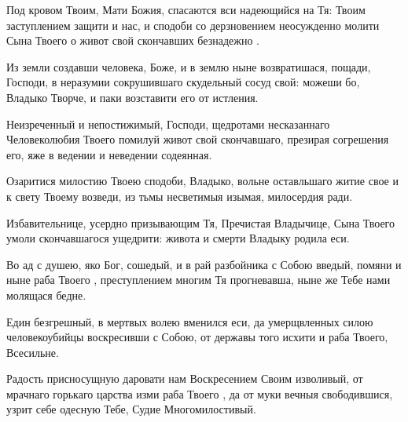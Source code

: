 \begin{mymulticols}
\inyne


Под кровом Твоим, Мати Божия, спасаются вси надеющийся на Тя: Твоим заступлением защити и нас, и сподоби со дерзновением неосужденно молити Сына Твоего о живот свой скончавших безнадежно . 








Из земли создавши человека, Боже, и в землю ныне возвратишася, пощади, Господи, в неразумии сокрушившаго скудельный сосуд свой: можеши бо, Владыко Творче, и паки возставити его от истления.




Неизреченный и непостижимый, Господи, щедротами несказаннаго Человеколюбия Твоего помилуй живот свой скончавшаго, презирая согрешения его, яже в ведении и неведении содеянная.


\slava


Озаритися милостию Твоею сподоби, Владыко, вольне оставльшаго  житие свое и к свету Твоему возведи, из тьмы несветимыя изымая, милосердия ради.


\inyne


Избавительнице, усердно призывающим Тя, Пречистая Владычице, Сына Твоего умоли скончавшагося  ущедрити: живота и смерти Владыку родила еси. 







Во ад с душею, яко Бог, сошедый, и в рай разбойника с Собою введый, помяни и ныне раба Твоего , преступлением многим Тя прогневавша, ныне же Тебе нами молящася бедне.




Един безгрешный, в мертвых волею вменился еси, да умерщвленных силою человекоубийцы воскресивши с Собою, от державы того исхити и раба Твоего, Всесильне.


\slava


Радость присносущную даровати нам Воскресением Своим изволивый, от мрачнаго горькаго царства изми раба Твоего , да от муки вечныя свободившися, узрит себе одесную Тебе, Судие Многомилостивый.



\end{mymulticols}
